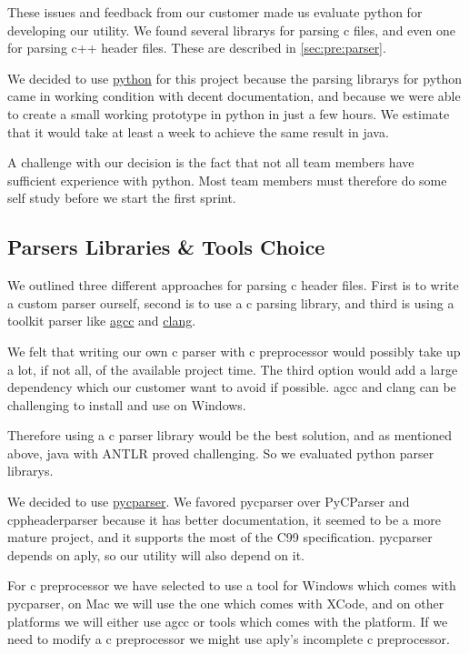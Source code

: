 These issues and feedback from our customer made us evaluate \Gls{python} for
developing our \gls{utility}. We found several \glspl{library} for parsing \Gls{c} files, and
even one for parsing \Gls{c++} \gls{header} files. These are described in
\autoref{sec:pre:parser}.

We decided to use \hyperref[sec:pre:python]{\Gls{python}} for this project because
the parsing \glspl{library} for \Gls{python} came in working condition with decent
documentation, and because we were able to create a small working prototype
in \Gls{python} in just a few hours. We estimate that it would take at least a week
to achieve the same result in \Gls{java}.

A challenge with our decision is the fact that not all team members have
sufficient experience with \Gls{python}. Most team members must therefore do some
self study before we start the first sprint.

\subsection{Parsers Libraries \& Tools Choice}
\label{sec:pre:parserchoice}
We outlined three different approaches for parsing \Gls{c} \gls{header} files. First is to
write a custom \gls{parser} ourself, second is to use a \Gls{c} parsing \gls{library}, and
third is using a toolkit \gls{parser} like \hyperref[sec:pre:gcc]{\Gls{agcc}} and
\hyperref[sec:pre:clang]{\Gls{clang}}.

We felt that writing our own \Gls{c} \gls{parser} with \Gls{c} \gls{preprocessor} would possibly take
up a lot, if not all, of the available project time. The third option would add
a large dependency which our customer want to avoid if possible. \Gls{agcc} and \Gls{clang}
can be challenging to install and use on Windows.

Therefore using a \Gls{c} \gls{parser} \gls{library} would be the best solution, and as mentioned
above, \Gls{java} with ANTLR proved challenging. So we evaluated \Gls{python} \gls{parser}
\glspl{library}.

We decided to use \hyperref[sec:pre:pycparser]{\gls{pycparser}}. We favored \gls{pycparser}
over PyCParser and cppheaderparser because it has better documentation, it
seemed to be a more mature project, and it supports the most of the C99
specification. \gls{pycparser} depends on \Gls{aply}, so our \gls{utility} will also depend on it.

For \Gls{c} \gls{preprocessor} we have selected to use a tool for Windows which comes with
\gls{pycparser}, on Mac we will use the one which comes with XCode, and on other
platforms we will either use \Gls{agcc} or tools which comes with the platform. If we
need to modify a \Gls{c} \gls{preprocessor} we might use \Gls{aply}'s incomplete \Gls{c} \gls{preprocessor}.

